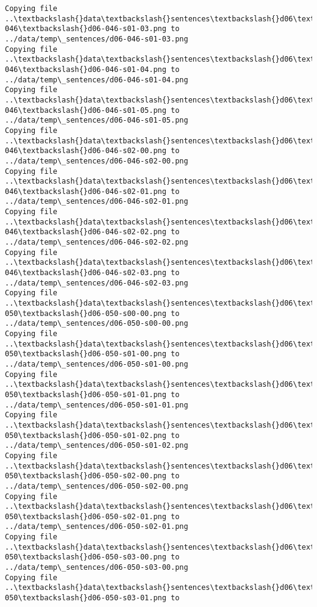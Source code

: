 \documentclass[11pt]{article}
\begin{document}
\begin{Verbatim}[commandchars=\\\{\}]
Copying file ..\textbackslash{}data\textbackslash{}sentences\textbackslash{}d06\textbackslash{}d06-046\textbackslash{}d06-046-s01-03.png to
../data/temp\_sentences/d06-046-s01-03.png
Copying file ..\textbackslash{}data\textbackslash{}sentences\textbackslash{}d06\textbackslash{}d06-046\textbackslash{}d06-046-s01-04.png to
../data/temp\_sentences/d06-046-s01-04.png
Copying file ..\textbackslash{}data\textbackslash{}sentences\textbackslash{}d06\textbackslash{}d06-046\textbackslash{}d06-046-s01-05.png to
../data/temp\_sentences/d06-046-s01-05.png
Copying file ..\textbackslash{}data\textbackslash{}sentences\textbackslash{}d06\textbackslash{}d06-046\textbackslash{}d06-046-s02-00.png to
../data/temp\_sentences/d06-046-s02-00.png
Copying file ..\textbackslash{}data\textbackslash{}sentences\textbackslash{}d06\textbackslash{}d06-046\textbackslash{}d06-046-s02-01.png to
../data/temp\_sentences/d06-046-s02-01.png
Copying file ..\textbackslash{}data\textbackslash{}sentences\textbackslash{}d06\textbackslash{}d06-046\textbackslash{}d06-046-s02-02.png to
../data/temp\_sentences/d06-046-s02-02.png
Copying file ..\textbackslash{}data\textbackslash{}sentences\textbackslash{}d06\textbackslash{}d06-046\textbackslash{}d06-046-s02-03.png to
../data/temp\_sentences/d06-046-s02-03.png
Copying file ..\textbackslash{}data\textbackslash{}sentences\textbackslash{}d06\textbackslash{}d06-050\textbackslash{}d06-050-s00-00.png to
../data/temp\_sentences/d06-050-s00-00.png
Copying file ..\textbackslash{}data\textbackslash{}sentences\textbackslash{}d06\textbackslash{}d06-050\textbackslash{}d06-050-s01-00.png to
../data/temp\_sentences/d06-050-s01-00.png
Copying file ..\textbackslash{}data\textbackslash{}sentences\textbackslash{}d06\textbackslash{}d06-050\textbackslash{}d06-050-s01-01.png to
../data/temp\_sentences/d06-050-s01-01.png
Copying file ..\textbackslash{}data\textbackslash{}sentences\textbackslash{}d06\textbackslash{}d06-050\textbackslash{}d06-050-s01-02.png to
../data/temp\_sentences/d06-050-s01-02.png
Copying file ..\textbackslash{}data\textbackslash{}sentences\textbackslash{}d06\textbackslash{}d06-050\textbackslash{}d06-050-s02-00.png to
../data/temp\_sentences/d06-050-s02-00.png
Copying file ..\textbackslash{}data\textbackslash{}sentences\textbackslash{}d06\textbackslash{}d06-050\textbackslash{}d06-050-s02-01.png to
../data/temp\_sentences/d06-050-s02-01.png
Copying file ..\textbackslash{}data\textbackslash{}sentences\textbackslash{}d06\textbackslash{}d06-050\textbackslash{}d06-050-s03-00.png to
../data/temp\_sentences/d06-050-s03-00.png
Copying file ..\textbackslash{}data\textbackslash{}sentences\textbackslash{}d06\textbackslash{}d06-050\textbackslash{}d06-050-s03-01.png to

\end{Verbatim}
\end{document}
